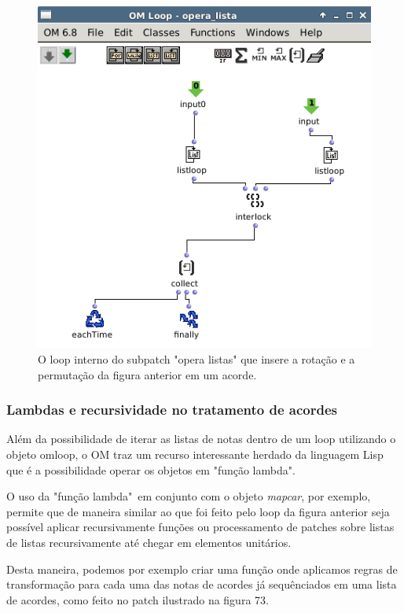 \documentclass[
	12pt,				%
	openright,			%
	twoside,			%
	a4paper,			%
	english,			%
	french,				%
	spanish,			%
	brazil				%
	]{abntex2}
\begin{document}
\begin{figure}[!h]
	\caption{\label{fig_grafico}O loop interno do subpatch "opera listas" que insere a rotação e a permutação da figura anterior em um acorde. }
	\begin{center}
	    \includegraphics[scale=0.5]{OMPD/opera_listas.png}
	\end{center}
\end{figure}


\subsubsection{Lambdas e recursividade no tratamento de acordes}

Além da possibilidade de iterar as listas de notas dentro de um loop utilizando o objeto omloop, o OM traz um recurso interessante herdado da linguagem Lisp que é a possibilidade operar os objetos em "função lambda". 

O uso da "função lambda"\ em conjunto com o objeto \textit{mapcar}, por exemplo, permite que de maneira similar ao que foi feito pelo loop da figura anterior seja possível aplicar recursivamente funções ou processamento de patches sobre listas de listas recursivamente até chegar em elementos unitários. 

Desta maneira, podemos por exemplo criar uma função onde aplicamos regras de transformação para cada uma das notas de acordes já sequênciados em uma lista de acordes, como feito no patch ilustrado na figura 73.
\end{document}
